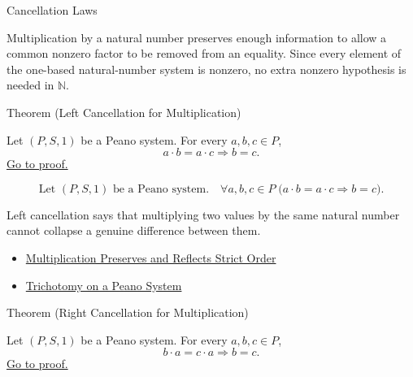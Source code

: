 \begin{topicbox}{Cancellation Laws}
\begin{exposition}
Multiplication by a natural number preserves enough information to allow a
common nonzero factor to be removed from an equality. Since every element of
the one-based natural-number system is nonzero, no extra nonzero hypothesis is
needed in $\mathbb{N}$.
\end{exposition}

\begin{theorembox}{Theorem (Left Cancellation for Multiplication)}
\begin{theorem}
\label{thm:multiplication-left-cancellation}
Let $(P,S,1)$ be a Peano system. For every $a,b,c \in P$,
\[
a\cdot b=a\cdot c
\Longrightarrow
b=c.
\]
\hyperref[prf:multiplication-left-cancellation]{Go to proof.}
\end{theorem}
\end{theorembox}

\begin{remark*}
\[
\text{Let } (P,S,1) \text{ be a Peano system.}\quad
\forall a,b,c \in P\;\bigl(a\cdot b=a\cdot c \Longrightarrow b=c\bigr).
\]
\end{remark*}

\begin{remark*}[Interpretation]
Left cancellation says that multiplying two values by the same natural number
cannot collapse a genuine difference between them.
\end{remark*}

\begin{dependencies}
\begin{itemize}
  \item \hyperref[thm:multiplication-preserves-and-reflects-strict-order]{Multiplication Preserves and Reflects Strict Order}
  \item \hyperref[thm:trichotomy-on-peano-system]{Trichotomy on a Peano System}
\end{itemize}
\end{dependencies}

\begin{theorembox}{Theorem (Right Cancellation for Multiplication)}
\begin{theorem}
\label{thm:multiplication-right-cancellation}
Let $(P,S,1)$ be a Peano system. For every $a,b,c \in P$,
\[
b\cdot a=c\cdot a
\Longrightarrow
b=c.
\]
\hyperref[prf:multiplication-right-cancellation]{Go to proof.}
\end{theorem}
\end{theorembox}


\end{topicbox}
